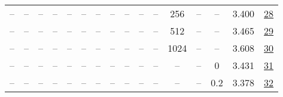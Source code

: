 \begin{table}[H]
\begin{tabular}{cccccccccccccccc}
-- & -- & -- & -- & -- & -- & -- & -- & -- & -- & -- & 256 & -- & -- & 3.400 & \href{https://wandb.ai/stanford-mercury/optimizer-scaling/runs/sweep-130m-5B-muon397840lr0.008-wd0.1-minlr0-warmup0-b10.8-b20.9-5abd23}{28} \\
-- & -- & -- & -- & -- & -- & -- & -- & -- & -- & -- & 512 & -- & -- & 3.465 & \href{https://wandb.ai/stanford-mercury/optimizer-scaling/runs/sweep-130m-5B-muon972c8blr0.008-wd0.1-minlr0-warmup0-b10.8-b20.9-f41012}{29} \\
-- & -- & -- & -- & -- & -- & -- & -- & -- & -- & -- & 1024 & -- & -- & 3.608 & \href{https://wandb.ai/stanford-mercury/optimizer-scaling/runs/sweep-130m-5B-muon479414lr0.008-wd0.1-minlr0-warmup0-b10.8-b20.9-c30205}{30} \\
-- & -- & -- & -- & -- & -- & -- & -- & -- & -- & -- & -- & -- & 0 & 3.431 & \href{https://wandb.ai/stanford-mercury/optimizer-scaling/runs/sweep-130m-5B-muon2c6c55lr0.008-wd0-minlr0-warmup0-b10.8-b20.98--1d92a5}{31} \\
-- & -- & -- & -- & -- & -- & -- & -- & -- & -- & -- & -- & -- & 0.2 & 3.378 & \href{https://wandb.ai/stanford-mercury/optimizer-scaling/runs/sweep-130m-5B-muon8527a8lr0.008-wd0.2-minlr0-warmup0-b10.8-b20.9-d76fe4}{32} \\
\bottomrule
\end{tabular}
\end{table}

